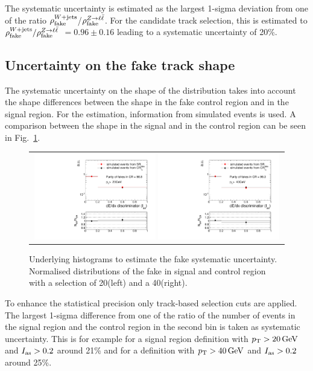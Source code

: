 The systematic uncertainty is estimated as the largest 1-sigma deviation from one of the ratio $\rho_{\text{fake}}^{W+\text{jets}}$/$\rho_{\text{fake}}^{Z\rightarrow\ell\bar{\ell}}$.
For the candidate track selection, this is estimated to $\rho_{\text{fake}}^{W+\text{jets}}/\rho_{\text{fake}}^{Z\rightarrow\ell\bar{\ell}}$ $ =  0.96 \pm 0.16 $ leading to a systematic uncertainty of 20\%.
\subsection{Uncertainty on the fake track \ias shape}
\label{sec:FakeIasUncertainty}
The systematic uncertainty on the shape of the \ias distribution takes into account the shape differences between the \ias shape in the fake control region \fakeCR and in the signal region.
For the estimation, information from simulated \WJets events is used.
A comparison between the \ias shape in the signal and in the control region can be seen in Fig.~\ref{fig:FakeIasUnc}.
\begin{figure}[!bt]
  \centering 
  \begin{tabular}{c}
    \includegraphics[width=0.49\textwidth]{figures/analysis/Background/hASmi_SRbinning_fakes_ECalaoLe5_trackPtGt20_MC_CR_MC_SR.pdf}
    \includegraphics[width=0.49\textwidth]{figures/analysis/Background/hASmi_SRbinning_fakes_ECalaoLe5_trackPtGt40_MC_CR_MC_SR.pdf}
  \end{tabular}
  \caption{Underlying histograms to estimate the fake \ias systematic uncertainty. Normalised distributions of the fake \ias in signal and control region with a \pt selection of 20\gev (left) and a 40\gev (right).}
  \label{fig:FakeIasUnc}
\end{figure}
To enhance the statistical precision only track-based selection cuts are applied.
The largest 1-sigma difference from one of the ratio of the number of events in the signal region and the control region in the second bin is taken as systematic uncertainty.
This is for example for a signal region definition with $p_{\text{T}}>20\,\text{Ge}\kern-0.06667em\text{V}$ and $I_{\text{as}}>0.2$ around 21\% and for a definition with $p_{\text{T}}>40\,\text{Ge}\kern-0.06667em\text{V}$ and $I_{\text{as}}>0.2$ around 25\%.


